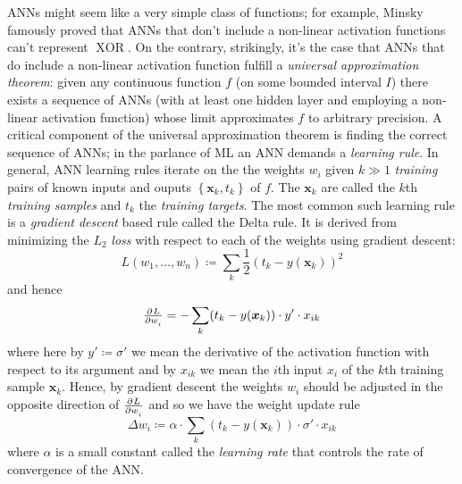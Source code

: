 ANNs might seem like a very simple class of functions;
%
for example, Minsky \etal\cite{minsky2017perceptrons} famously proved that ANNs that don't include a non-linear activation functions can't represent \(\operatorname{XOR}\). 
%
On the contrary, strikingly, it's the case that ANNs that do include a non-linear activation function fulfill a \textit{universal approximation theorem}\cite{cybenko1989approximation}:
%
given any continuous function \(f\) (on some bounded interval \(I\)) there exists a sequence of ANNs (with at least one hidden layer and employing a non-linear activation function) whose limit approximates \(f\) to arbitrary precision.
%
A critical component of the universal approximation theorem is finding the correct sequence of ANNs; in the parlance of ML an ANN demands a \textit{learning rule}.
%
In general, ANN learning rules iterate on the the weights \(w_i\) given \(k \gg 1\) \textit{training} pairs of known inputs and ouputs \(\left\{ \bm{x}_k, t_k \right\}\) of \(f\). 
%
The \(\mathbf{x}_k\) are called the \(k\)th \textit{training samples} and \(t_k\) the  \textit{training targets}.
%
The most common such learning rule is a \textit{gradient descent} based rule called the Delta rule\cite{widrow1960adaptive}.
%
It is derived from minimizing the \(L_2\) \textit{loss} with respect to each of the weights using gradient descent:
\begin{equation}
    L(w_1, \dots, w_n) \coloneqq \sum_k \frac{1}{2} (t_k - y(\mathbf{x}_k))^2
    \label{eqn:loss}
\end{equation}
and hence
\begin{equation}
    \pd{L}{w_i} = - \sum_k(t_k-y(\bm{x}_k))\cdot y'\cdot x_{ik}
\end{equation}
where here by \(y' \coloneqq \sigma'\) we mean the derivative of the activation function with respect to its argument and by \(x_{ik}\) we mean the \(i\)th input \(x_i\) of the \(k\)th training sample \(\bm{x}_k\).
%
Hence, by gradient descent the weights \(w_i\) should be adjusted in the opposite direction of \(\pd{L}{w_i}\) and so we have the weight update rule
\begin{equation}
    \Delta w_i \coloneqq \alpha \cdot \sum_k(t_k-y(\mathbf{x}_k))\cdot \sigma'\cdot x_{ik}
    \label{eqn:batchupdate}
\end{equation}
where \(\alpha\) is a small constant called the \textit{learning rate} that controls the rate of convergence of the ANN.


